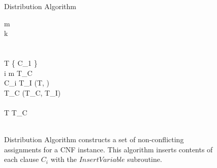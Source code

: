 
\begin{figure}[htbp]
\begin{center}

	\begin{pseudocode}{Distribution Algorithm}{\phi}
	
	m \\
	k \\
	\\
	\\
	T \GETS \{ C_1 \} \\
	
	\FOR i   m \DO
		\BEGIN 
			T_C \GETS \emptyset \\
		\FOREACH {} \ell {} C_i \DO
			\BEGIN
				T_I \GETS {}(T, \ell)\\
				T_C \GETS {}(T_C, T_I)\\
			\END\\
			T \GETS T_C\\
		\END
	\\
	\end{pseudocode}

\caption{{\sc Distribution Algorithm} constructs a set of non-conflicting assignments for a CNF instance.  This algorithm inserts contents of each clause $C_i$ with the $Insert Variable$ subroutine.}
\label{distributionAlgorithm}
\end{center}
\end{figure}

